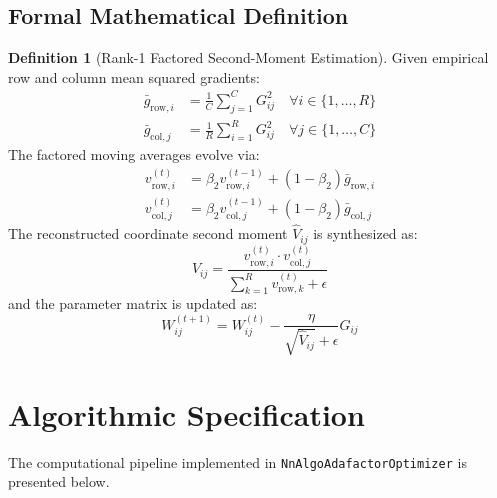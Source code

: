 \documentclass[11pt,a4paper]{article}
\theoremstyle{definition}
\newtheorem{definition}{Definition}[section]
\begin{document}
\subsection{Formal Mathematical Definition}
\begin{definition}[Rank-1 Factored Second-Moment Estimation]
Given empirical row and column mean squared gradients:
\begin{align}
\bar{g}_{\text{row}, i} &= \frac{1}{C} \sum_{j=1}^C G_{ij}^2 \quad \forall i \in \{1, \dots, R\} \label{eq:row_mean} \\
\bar{g}_{\text{col}, j} &= \frac{1}{R} \sum_{i=1}^R G_{ij}^2 \quad \forall j \in \{1, \dots, C\} \label{eq:col_mean}
\end{align}
The factored moving averages evolve via:
\begin{align}
v_{\text{row}, i}^{(t)} &= \beta_2 v_{\text{row}, i}^{(t-1)} + (1 - \beta_2) \bar{g}_{\text{row}, i} \label{eq:adafactor_vrow} \\
v_{\text{col}, j}^{(t)} &= \beta_2 v_{\text{col}, j}^{(t-1)} + (1 - \beta_2) \bar{g}_{\text{col}, j} \label{eq:adafactor_vcol}
\end{align}
The reconstructed coordinate second moment $\hat{V}_{ij}$ is synthesized as:
\begin{equation}
\hat{V}_{ij} = \frac{v_{\text{row}, i}^{(t)} \cdot v_{\text{col}, j}^{(t)}}{\sum_{k=1}^R v_{\text{row}, k}^{(t)} + \epsilon} \label{eq:adafactor_recon}
\end{equation}
and the parameter matrix is updated as:
\begin{equation}
W_{ij}^{(t+1)} = W_{ij}^{(t)} - \frac{\eta}{\sqrt{\hat{V}_{ij}} + \epsilon} G_{ij} \label{eq:adafactor_update}
\end{equation}
\end{definition}

\section{Algorithmic Specification}

The computational pipeline implemented in \texttt{NnAlgoAdafactorOptimizer} is presented below.
\end{document}
